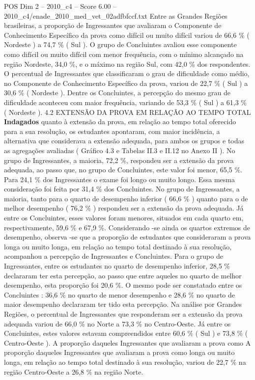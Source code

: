 \begin{textsample}{POS Dim 2 – 2010\_c4 – Score 6.00 – 2010\_c4/enade\_2010\_med\_vet\_02adfbfccf.txt}
Entre as Grandes Regiões brasileiras, a proporção de Ingressantes que avaliaram o Componente de Conhecimento Específico da prova como difícil ou muito difícil variou de 66,6 \% ( Nordeste ) a 74,7 \% ( Sul ).
O grupo de Concluintes avaliou esse componente como difícil ou muito difícil com menor frequência, com o mínimo alcançado na região Nordeste, 34,0 \%, e o máximo na região Sul, com 42,0 \% dos respondentes.
O percentual de Ingressantes que classificaram o grau de dificuldade como médio, no Componente de Conhecimento Específico da prova, variou de 22,7 \% ( Sul ) a 30,6 \% ( Nordeste ).
Dentre os Concluintes, a percepção do mesmo grau de dificuldade aconteceu com maior frequência, variando de 53,3 \% ( Sul ) a 61,3 \% ( Nordeste ). 4.2 EXTENSÃO DA PROVA EM RELAÇÃO AO TEMPO TOTAL \textbf{Indagados} quanto à extensão da prova, em relação ao tempo total oferecido para a sua resolução, os estudantes apontaram, com maior incidência, a alternativa que considerava a extensão adequada, para ambos os grupos e todas as agregações avaliadas ( Gráfico 4.3 e Tabelas II.3 e II.12 no Anexo II ).
No grupo de Ingressantes, a maioria, 72,2 \%, respondeu ser a extensão da prova adequada, ao passo que, no grupo de Concluintes, este valor foi menor, 65,5 \%.
Para 24,1 \% dos Ingressantes o exame foi longo ou muito longo.
Essa mesma consideração foi feita por 31,4 \% dos Concluintes.
No grupo de Ingressantes, a maioria, tanto para o quarto de desempenho inferior ( 66,6 \% ) quanto para o de melhor desempenho ( 76,2 \% ) respondeu ser a extensão da prova adequada.
Já entre os Concluintes, esses valores foram menores, situados em cada quarto em, respectivamente, 59,6 \% e 67,9 \%.
Considerando -se ainda os quartos extremos de desempenho, observa -se que a proporção de estudantes que consideraram a prova longa ou muito longa, em relação ao tempo total destinado à sua resolução, acompanhou a percepção de Ingressantes e Concluintes.
Para o grupo de Ingressantes, entre os estudantes no quarto de desempenho inferior, 28,5 \% declararam ter esta percepção, ao passo que entre aqueles no quarto de melhor desempenho, esta proporção foi 20,6 \%.
O mesmo pode ser constatado entre os Concluintes : 36,6 \% no quarto de menor desempenho e 28,6 \% no quarto de maior desempenho declararam ter tido esta percepção.
Na análise por Grandes Regiões, o percentual de Ingressantes que responderam ser a extensão da prova adequada variou de 66,0 \% no Norte a 73,3 \% no Centro-Oeste.
Já entre os Concluintes, estes valores estavam compreendidos entre 60,6 \% ( Sul ) e 73,8 \% ( Centro-Oeste ).
A proporção daqueles Ingressantes que avaliaram a prova como A proporção daqueles Ingressantes que avaliaram a prova como longa ou muito longa, em relação ao tempo total destinado à sua resolução, variou de 22,7 \% na região Centro-Oeste a 26,8 \% na região Norte.

\end{textsample}
